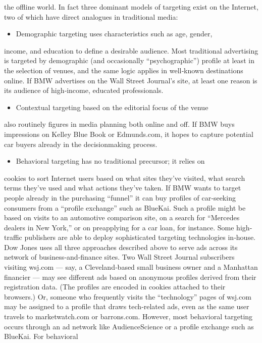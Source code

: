the offline world. In fact three dominant models of targeting exist on the
Internet, two of which have direct analogues in traditional media:
\begin{itemize}
\item Demographic targeting uses characteristics such as age, gender,
\end{itemize}
income, and education to define a desirable audience. Most
traditional advertising is targeted by demographic (and
occasionally ``psychographic'') profile at least in the selection of
venues, and the same logic applies in well‐known destinations
online. If BMW advertises on the Wall Street Journal’s site, at
least one reason is its audience of high‐income, educated
professionals.
\begin{itemize}
\item Contextual targeting based on the editorial focus of the venue
\end{itemize}
also routinely figures in media planning both online and off. If
BMW buys impressions on Kelley Blue Book or Edmunds.com,
it hopes to capture potential car buyers already in the decisionmaking
process.
\begin{itemize}
\item Behavioral targeting has no traditional precursor; it relies on
\end{itemize}
cookies to sort Internet users based on what sites they’ve
visited, what search terms they’ve used and what actions
they’ve taken. If BMW wants to target people already in the
purchasing ``funnel'' it can buy profiles of car‐seeking
consumers from a ``profile exchange'' such as BlueKai. Such a
profile might be based on visits to an automotive comparison
site, on a search for ``Mercedes dealers in New York,'' or on preapplying
for a car loan, for instance.
Some high‐traffic publishers are able to deploy sophisticated targeting
technologies in‐house. Dow Jones uses all three approaches described
above to serve ads across its network of business‐and‐finance sites. Two
Wall Street Journal subscribers visiting wsj.com — say, a Cleveland‐based
small business owner and a Manhattan financier — may see different ads
based on anonymous profiles derived from their registration data. (The
profiles are encoded in cookies attached to their browsers.) Or, someone
who frequently visits the ``technology'' pages of wsj.com may be assigned
to a profile that draws tech‐related ads, even as the same user travels to
marketwatch.com or barrons.com.
However, most behavioral targeting occurs through an ad network like
AudienceScience or a profile exchange such as BlueKai. For behavioral
